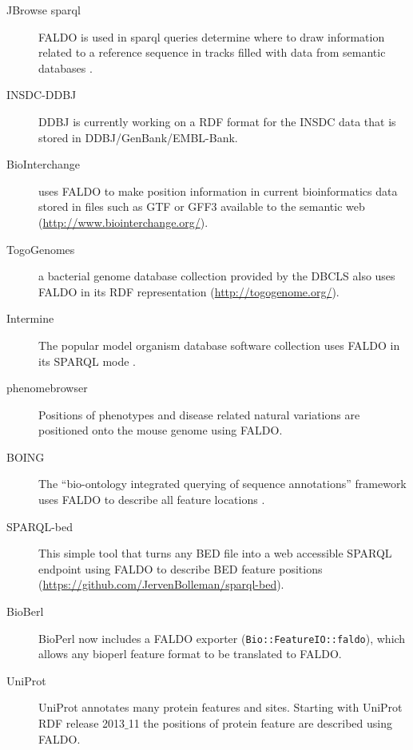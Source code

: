 \begin{description}
\item[JBrowse sparql] FALDO is used in sparql queries determine where to draw information related to a reference sequence in tracks filled with data from semantic databases \cite{JBrowse}.
\item[INSDC-DDBJ] DDBJ is currently working on a RDF format for the INSDC data that is stored in DDBJ/GenBank/EMBL-Bank.
\item[BioInterchange] uses FALDO to make position information in current bioinformatics data stored in files such as GTF or GFF3 available to the semantic web (\url{http://www.biointerchange.org/}).
\item[TogoGenomes] a bacterial genome database collection provided by the DBCLS also uses FALDO in its RDF representation (\url{http://togogenome.org/}).
\item[Intermine] The popular model organism database software collection uses FALDO in its SPARQL mode \cite{InterMine}.
\item[phenomebrowser] Positions of phenotypes and disease related natural variations are positioned onto the mouse genome using FALDO.
\item[BOING] The ``bio-ontology integrated querying of sequence annotations'' framework uses FALDO to describe all feature locations \cite{BOING}.
\item[SPARQL-bed] This simple tool that turns any BED file into a web accessible SPARQL endpoint using FALDO to describe BED feature positions (\url{https://github.com/JervenBolleman/sparql-bed}).
\item[BioBerl] BioPerl\cite{BioPerl2002} now includes a FALDO exporter (\texttt{Bio::FeatureIO::faldo}), which allows any bioperl feature format to be translated to FALDO.
\item[UniProt] UniProt annotates many protein features and sites. Starting with UniProt RDF release 2013$\_$11 the positions of protein feature are described using FALDO.
\end{description}


